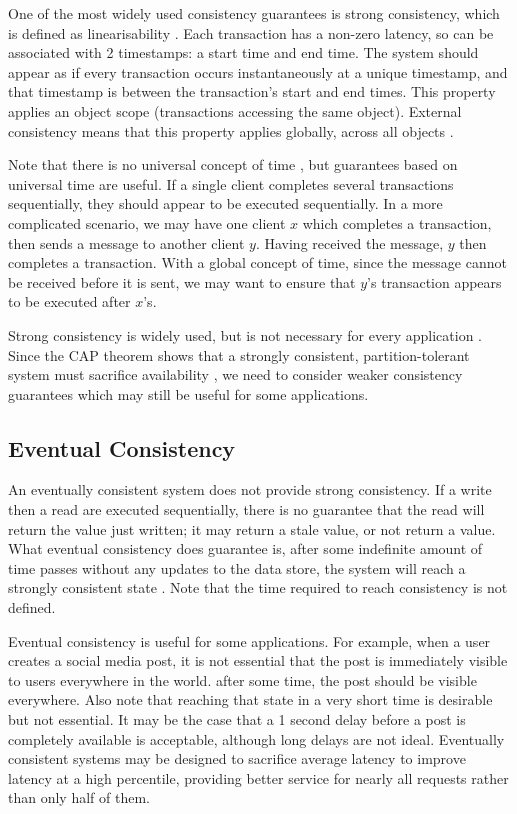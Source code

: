 \documentclass[12pt,a4paper,twoside,openany]{report}
\begin{document}
One of the most widely used consistency guarantees is strong consistency, which is defined as linearisability \cite{herlihy1990linearizability}. Each transaction has a non-zero latency, so can be associated with 2 timestamps: a start time and end time. The system should appear as if every transaction occurs instantaneously at a unique timestamp, and that timestamp is between the transaction's start and end times. This property applies an object scope (transactions accessing the same object). External consistency means that this property applies globally, across all objects \cite{45855}.

Note that there is no universal concept of time \cite{bacon2003operating}, but guarantees based on universal time are useful. If a single client completes several transactions sequentially, they should appear to be executed sequentially. In a more complicated scenario, we may have one client $x$ which completes a transaction, then sends a message to another client $y$. Having received the message, $y$ then completes a transaction. With a global concept of time, since the message cannot be received before it is sent, we may want to ensure that $y$'s transaction appears to be executed after $x$'s.

Strong consistency is widely used, but is not necessary for every application \cite{vogels_2008}. Since the CAP theorem shows that a strongly consistent, partition-tolerant system must sacrifice availability \cite{gilbert}, we need to consider weaker consistency guarantees which may still be useful for some applications.

\subsection*{Eventual Consistency}

An eventually consistent system does not provide strong consistency. If a write then a read are executed sequentially, there is no guarantee that the read will return the value just written; it may return a stale value, or not return a value. What eventual consistency does guarantee is, after some indefinite amount of time passes without any updates to the data store, the system will reach a strongly consistent state \cite{vogels_2008}. Note that the time required to reach consistency is not defined.

Eventual consistency is useful for some applications. For example, when a user creates a social media post, it is not essential that the post is immediately visible to users everywhere in the world. after some time, the post should be visible everywhere. Also note that reaching that state in a very short time is desirable but not essential. It may be the case that a 1 second delay before a post is completely available is acceptable, although long delays are not ideal. Eventually consistent systems may be designed to sacrifice average latency to improve latency at a high percentile, providing better service for nearly all requests rather than only half of them.
\end{document}
